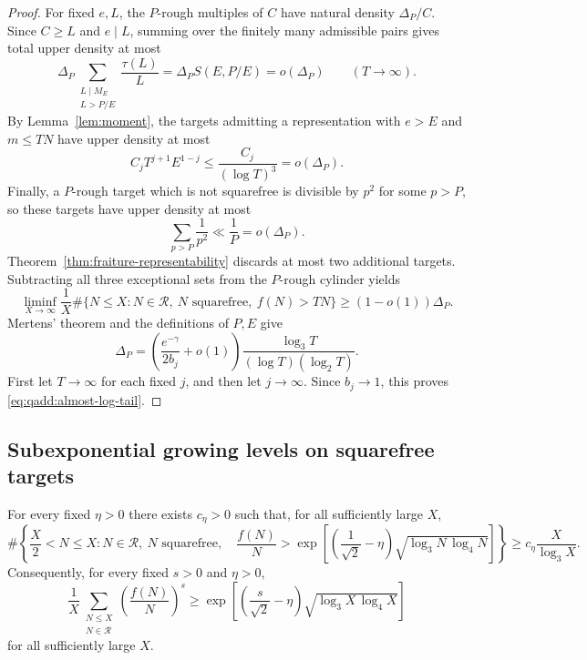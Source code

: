 \begin{proof}
For fixed $e,L$, the $P$-rough multiples of $C$ have natural
density $\Delta_P/C$. Since $C\geq L$ and $e\mid L$, summing
over the finitely many admissible pairs gives total upper density
at most
\[
 \Delta_P\sum_{\substack{L\mid M_E\\L>P/E}}
                         \frac{\tau(L)}L
 =\Delta_P S(E,P/E)
 =o(\Delta_P)
 \qquad(T\to\infty).
\]
By Lemma~\ref{lem:moment}, the targets admitting a
representation with $e>E$ and $m\leq TN$ have upper density
at most
\[
 C_jT^{j+1}E^{1-j}
 \leq\frac{C_j}{(\log T)^3}
 =o(\Delta_P).
\]
Finally, a $P$-rough target which is not squarefree is divisible
by $p^2$ for some $p>P$, so these targets have upper density
at most
\[
 \sum_{p>P}\frac1{p^2}\ll\frac1P=o(\Delta_P).
\]
Theorem~\ref{thm:fraiture-representability} discards at most
two additional targets. Subtracting all three exceptional sets
from the $P$-rough cylinder yields
\[
 \liminf_{X\to\infty}\frac1X
 \#\{N\leq X:N\in\mathcal R,\ N\text{ squarefree},\ f(N)>TN\}
 \geq(1-o(1))\Delta_P.
\]
Mertens' theorem and the definitions of $P,E$ give
\[
 \Delta_P
 =\left(\frac{e^{-\gamma}}{2b_j}+o(1)\right)
       \frac{\log_3T}{(\log T)(\log_2T)}.
\]
First let $T\to\infty$ for each fixed $j$, and then let
$j\to\infty$. Since $b_j\to1$, this proves
\eqref{eq:qadd:almost-log-tail}.
\end{proof}

\subsection{Subexponential growing levels on squarefree targets}

\begin{theorem}
\label{thm:qadd:growing-level}
For every fixed $\eta>0$ there exists $c_\eta>0$ such that,
for all sufficiently large $X$,
\begin{equation}
\label{eq:qadd:growing-level}
 \#\left\{\frac X2<N\leq X:
       N\in\mathcal R,\ N\text{ squarefree},\quad
       \frac{f(N)}N>
       \exp\left[
         \left(\frac1{\sqrt2}-\eta\right)
         \sqrt{\log_3N\,\log_4N}
       \right]\right\}
 \geq c_\eta\frac X{\log_3X}.
\end{equation}
Consequently, for every fixed $s>0$ and $\eta>0$,
\begin{equation}
\label{eq:qadd:positive-moment-growth}
 \frac1X\sum_{\substack{N\leq X\\N\in\mathcal R}}
       \left(\frac{f(N)}N\right)^s
 \geq
 \exp\left[
       \left(\frac{s}{\sqrt2}-\eta\right)
       \sqrt{\log_3X\,\log_4X}
      \right]
\end{equation}
for all sufficiently large $X$.
\end{theorem}


